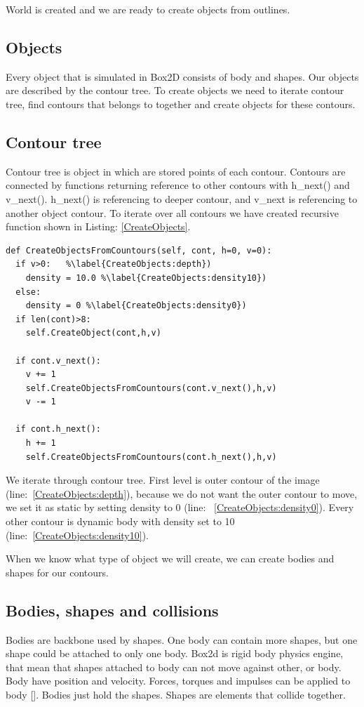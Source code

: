 \documentclass{ifacconf}
\begin{document}
World is created and we are ready to create objects from outlines.
\subsection{Objects}
Every object that is simulated in Box2D consists of body and shapes. Our objects
are described by the contour tree. To create objects we need to iterate contour
tree, find contours that belongs to together and create objects for these
contours.
\subsection{Contour tree}
Contour tree is object in which are stored points of each contour. Contours are
connected by functions returning reference to other contours with h\_next() and
v\_next(). h\_next() is referencing to deeper contour, and v\_next is
referencing to another object contour. To iterate over all contours we have
created recursive function shown in Listing: \ref{CreateObjects}.
\begin{lstlisting}[label=CreateObjects,caption=Function to iterate through
contour tree]
def CreateObjectsFromCountours(self, cont, h=0, v=0):
  if v>0:	%\label{CreateObjects:depth})
    density = 10.0 %\label{CreateObjects:density10})
  else:
    density = 0 %\label{CreateObjects:density0})
  if len(cont)>8:
    self.CreateObject(cont,h,v) 

  if cont.v_next():
    v += 1
    self.CreateObjectsFromCountours(cont.v_next(),h,v)
    v -= 1

  if cont.h_next():
    h += 1
    self.CreateObjectsFromCountours(cont.h_next(),h,v)
\end{lstlisting}
We iterate through contour tree. First level is outer contour of the image
(line:~\ref{CreateObjects:depth}), because we do not want the outer contour to
move, we set it as static by setting density to 0 (line:~
\ref{CreateObjects:density0}). Every other contour is dynamic body with density
set to 10 (line:~\ref{CreateObjects:density10}).

When we know what type of object we will create, we can create bodies and
shapes for our contours.
\subsection{Bodies, shapes and collisions}
Bodies are backbone used by shapes. One body can contain more shapes, but one
shape could be attached to only one body. Box2d is rigid body physics engine,
that mean that shapes attached to body can not move against other, or body. Body
have position and velocity. Forces, torques and impulses can be applied to body
[\cite{Box2DManual}].  Bodies just hold the shapes. Shapes are elements that
collide together.
\end{document}
